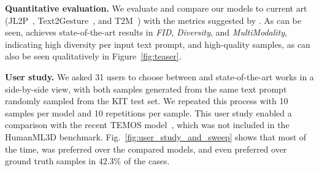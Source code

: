 \textbf{Quantitative evaluation.} We evaluate and compare our models to current art (JL2P~\citet{ahuja2019language2pose}, Text2Gesture~\citep{bhattacharya2021text2gestures}, and T2M~\citep{guo2022generating}) with the metrics suggested by \citet{guo2022generating}. 
As can be seen, \ourmethod{} achieves state-of-the-art results in \textit{FID}, \textit{Diversity}, and \textit{MultiModality}, indicating high diversity per input text prompt, and high-quality samples, as can also be seen qualitatively in Figure~\ref{fig:teaser}.

\textbf{User study.} We asked 31 users to choose between \ourmethod{} and 
state-of-the-art works
in a side-by-side view, with both samples generated from the same text prompt randomly sampled from the KIT test set. We repeated this process with 10 samples per model and 10 repetitions per sample. 
This user study enabled a comparison with the recent TEMOS model~\citep{petrovich22temos}, which was not included in the HumanML3D benchmark.
Fig.~\ref{fig:user_study_and_sweep} shows that most of the time, \ourmethod{} was preferred over the compared models, and even preferred over ground truth samples in $42.3\%$ of the cases.


